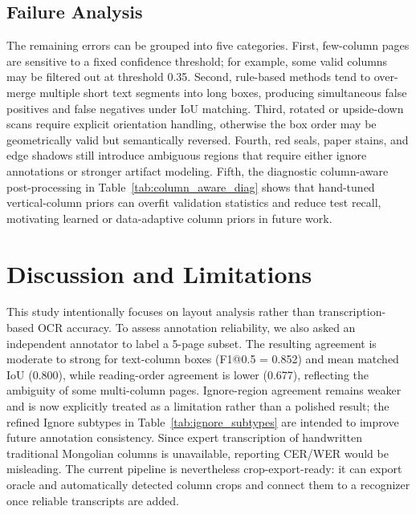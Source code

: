 \documentclass[12pt]{article}
\begin{document}
\subsection{Failure Analysis}
The remaining errors can be grouped into five categories. First, few-column pages are sensitive to a fixed confidence threshold; for example, some valid columns may be filtered out at threshold 0.35. Second, rule-based methods tend to over-merge multiple short text segments into long boxes, producing simultaneous false positives and false negatives under IoU matching. Third, rotated or upside-down scans require explicit orientation handling, otherwise the box order may be geometrically valid but semantically reversed. Fourth, red seals, paper stains, and edge shadows still introduce ambiguous regions that require either ignore annotations or stronger artifact modeling. Fifth, the diagnostic column-aware post-processing in Table~\ref{tab:column_aware_diag} shows that hand-tuned vertical-column priors can overfit validation statistics and reduce test recall, motivating learned or data-adaptive column priors in future work.

\section{Discussion and Limitations}
\label{sec:discussion}
This study intentionally focuses on layout analysis rather than transcription-based OCR accuracy. To assess annotation reliability, we also asked an independent annotator to label a 5-page subset. The resulting agreement is moderate to strong for text-column boxes (F1@0.5 = 0.852) and mean matched IoU (0.800), while reading-order agreement is lower (0.677), reflecting the ambiguity of some multi-column pages. Ignore-region agreement remains weaker and is now explicitly treated as a limitation rather than a polished result; the refined Ignore subtypes in Table~\ref{tab:ignore_subtypes} are intended to improve future annotation consistency. Since expert transcription of handwritten traditional Mongolian columns is unavailable, reporting CER/WER would be misleading. The current pipeline is nevertheless crop-export-ready: it can export oracle and automatically detected column crops and connect them to a recognizer once reliable transcripts are added.
\end{document}
